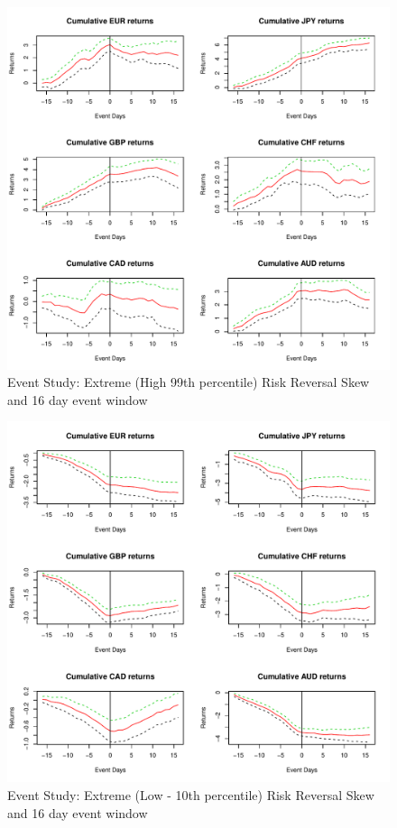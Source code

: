 \documentclass[12pt, a4paper, oneside]{article} %
\begin{document}
\begin{figure}[h!]
\graphicspath{{../Figures/}}
\centering
\caption{Event Study:  Extreme (High 99th percentile) Risk Reversal Skew and 16 day event window}
\label{fig:ES1}
\includegraphics[scale=0.8]{RRCum16}
\end{figure}


\begin{figure}[h!]
\graphicspath{{../Figures/}}
\centering
\caption{Event Study:  Extreme (Low - 10th percentile) Risk Reversal Skew and 16 day event window}
\label{fig:ES2}
\includegraphics[scale=0.8]{RRCum16a}
\end{figure}
\end{document}
